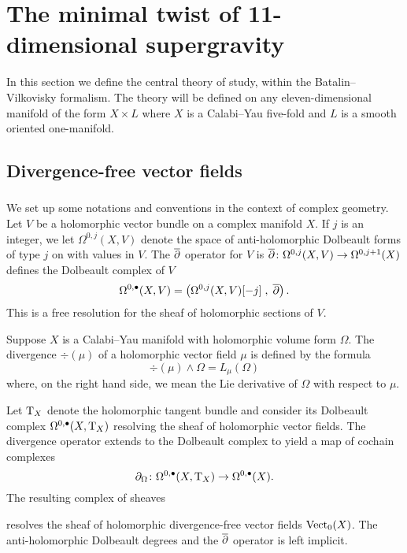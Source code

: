 \section{The minimal twist of 11-dimensional supergravity} 
\label{s:dfn}

In this section we define the central theory of study, within the Batalin--Vilkovisky formalism.
The theory will be defined on any eleven-dimensional manifold of the form $X \times L$ where $X$ is a Calabi--Yau five-fold and $L$ is a smooth oriented one-manifold.

\subsection{Divergence-free vector fields} 

\subsubsection{}
\label{sec:divfree}
We set up some notations and conventions in the context of complex geometry. 
Let $V$ be a holomorphic vector bundle on a complex manifold $X$. 
If $j$ is an integer, we let $\Omega^{0,j}(X, V)$ denote the space of anti-holomorphic Dolbeault forms of type $j$ on with values in $V$.
The $\overline{\partial}$ operator for $V$ is $\overline{\partial} \colon \Omega^{0,j}(X, V)\to \Omega^{0,j+1}(X)$ defines the Dolbeault complex of $V$
\[
  \Omega^{0,\bullet}(X, V) = \left(\Omega^{0,j}(X, V)[-j] \; , \; \overline{\partial}\right) .
\]
This is a free resolution for the sheaf of holomorphic sections of $V$.

Suppose $X$ is a Calabi--Yau manifold with holomorphic volume form $\Omega$.
The divergence $\div(\mu)$ of a holomorphic vector field $\mu$ is defined by the formula
\[
\div (\mu) \wedge \Omega = L_\mu (\Omega)
\]
where, on the right hand side, we mean the Lie derivative of $\Omega$ with respect to $\mu$.

Let ${\rm T}_X$ denote the holomorphic tangent bundle and consider its Dolbeault complex $\Omega^{0,\bullet}(X , {\rm T}_X)$ resolving the sheaf of holomorphic vector fields. 
The divergence operator extends to the Dolbeault complex to yield a map of cochain complexes 
\[
\partial_{\Omega} \colon \Omega^{0,\bullet}(X , {\rm T}_X) \to \Omega^{0,\bullet}(X) .
\]
The resulting complex of sheaves
\beqn\label{eqn:cplx1}
\eeqn
resolves the sheaf of holomorphic divergence-free vector fields ${\rm Vect}_0 (X)$.
The anti-holomorphic Dolbeault degrees and the $\overline{\partial}$ operator is left implicit. 

